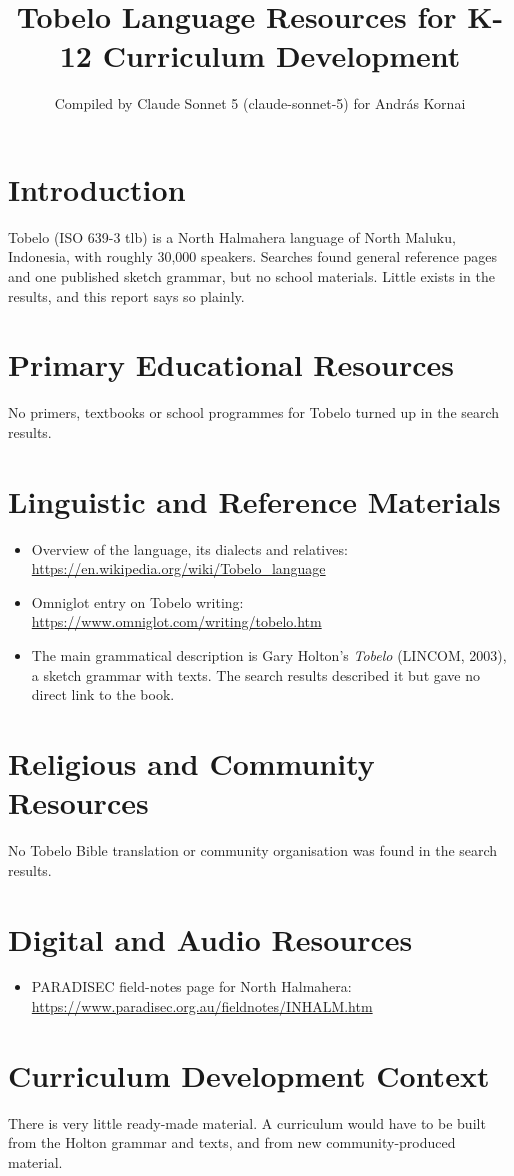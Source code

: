 \documentclass[12pt]{article}
\title{Tobelo Language Resources for K-12 Curriculum Development}
\author{Compiled by Claude Sonnet 5 (claude-sonnet-5) for Andr\'as Kornai}
\date{}
\begin{document}
\maketitle

\section{Introduction}
Tobelo (ISO 639-3 tlb) is a North Halmahera language of North Maluku, Indonesia, with roughly 30,000 speakers. Searches found general reference pages and one published sketch grammar, but no school materials. Little exists in the results, and this report says so plainly.

\section{Primary Educational Resources}
No primers, textbooks or school programmes for Tobelo turned up in the search results.

\section{Linguistic and Reference Materials}
\begin{itemize}
\item Overview of the language, its dialects and relatives: \url{https://en.wikipedia.org/wiki/Tobelo_language}
\item Omniglot entry on Tobelo writing: \url{https://www.omniglot.com/writing/tobelo.htm}
\item The main grammatical description is Gary Holton's \emph{Tobelo} (LINCOM, 2003), a sketch grammar with texts. The search results described it but gave no direct link to the book.
\end{itemize}

\section{Religious and Community Resources}
No Tobelo Bible translation or community organisation was found in the search results.

\section{Digital and Audio Resources}
\begin{itemize}
\item PARADISEC field-notes page for North Halmahera: \url{https://www.paradisec.org.au/fieldnotes/INHALM.htm}
\end{itemize}

\section{Curriculum Development Context}
There is very little ready-made material. A curriculum would have to be built from the Holton grammar and texts, and from new community-produced material.
\end{document}
